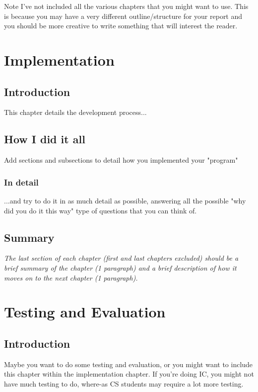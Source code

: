 \documentclass[final,a4paper,11pt]{report}
\begin{document}
Note I've not included all the various chapters that you might want to use. This is because you may have a very different outline/structure for your report and you should be more creative to write something that will interest the reader.


\clearpage

\chapter{Implementation}\label{chap:implementation}
\section{Introduction}
This chapter details the development process...

\section{How I did it all}
Add sections and subsections to detail how you implemented your "program"

\subsection{In detail}
...and try to do it in as much detail as possible, answering all the possible "why did you do it this way" type of questions that you can think of.

\section{Summary}
\textit{The last section of each chapter (first and last chapters excluded) should be a brief summary of the chapter (1 paragraph) and a brief description of how it moves on to the next chapter (1 paragraph).}

\clearpage

\chapter{Testing and Evaluation}\label{chap:testing}
\section{Introduction}
Maybe you want to do some testing and evaluation, or you might want to include this chapter within the implementation chapter. If you're doing IC, you might not have much testing to do, where-as CS students may require a lot more testing.
\end{document}
